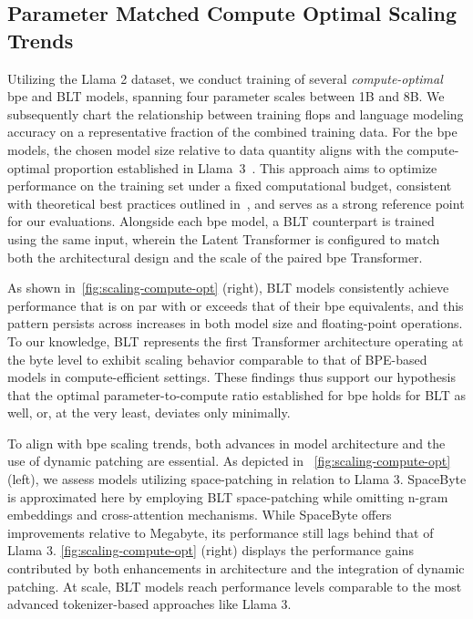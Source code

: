 \subsection{Parameter Matched Compute Optimal Scaling Trends}
\label{section:parameter-matched-scaling}
Utilizing the Llama 2 dataset, we conduct training of several \textit{compute-optimal} bpe and {\textsc BLT} models, spanning four parameter scales between 1B and 8B. We subsequently chart the relationship between training flops and language modeling accuracy on a representative fraction of the combined training data. For the bpe models, the chosen model size relative to data quantity aligns with the compute-optimal proportion established in Llama~3~\citep{dubey2024llama}. This approach aims to optimize performance on the training set under a fixed computational budget, consistent with theoretical best practices outlined in~\citep{hoffmann2022training}, and serves as a strong reference point for our evaluations. Alongside each bpe model, a {\textsc BLT} counterpart is trained using the same input, wherein the Latent Transformer is configured to match both the architectural design and the scale of the paired bpe Transformer.

As shown in~\autoref{fig:scaling-compute-opt} (right), {\textsc BLT} models consistently achieve performance that is on par with or exceeds that of their bpe equivalents, and this pattern persists across increases in both model size and floating-point operations. To our knowledge, {\textsc BLT} represents the first Transformer architecture operating at the byte level to exhibit scaling behavior comparable to that of BPE-based models in compute-efficient settings. These findings thus support our hypothesis that the optimal parameter-to-compute ratio established for bpe holds for {\textsc BLT} as well, or, at the very least, deviates only minimally.

To align with bpe scaling trends, both advances in model architecture and the use of dynamic patching are essential. As depicted in ~\autoref{fig:scaling-compute-opt} (left), we assess models utilizing space-patching in relation to Llama 3. SpaceByte \citep{slagle2024spacebyte} is approximated here by employing {\textsc BLT} space-patching while omitting n-gram embeddings and cross-attention mechanisms. While SpaceByte offers improvements relative to Megabyte, its performance still lags behind that of Llama 3. \autoref{fig:scaling-compute-opt} (right) displays the performance gains contributed by both enhancements in architecture and the integration of dynamic patching. At scale, {\textsc BLT} models reach performance levels comparable to the most advanced tokenizer-based approaches like Llama 3.

